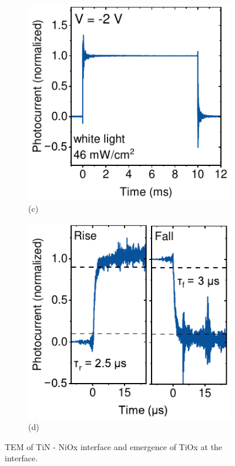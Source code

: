 \begin{figure}[htbp]
    \vspace{0.5cm}
    \begin{subfigure}[t]{0.4\textwidth}
        \centering
        \includegraphics[width=\textwidth]{chapters/transport_layers/images/TPC.pdf} %
        \caption*{(c)}
    \end{subfigure}
    \hspace{1.2cm}
    \begin{subfigure}[t]{0.4\textwidth}
        \centering
        \includegraphics[width=\textwidth]{chapters/transport_layers/images/TPC_rise_fall.pdf} %
        \caption*{(d)}
    \end{subfigure}
    \caption{TEM of TiN - NiOx interface and emergence of TiOx at the interface.}
    \label{fig:pix_pepd_linearity_and_tpc}
\end{figure}

